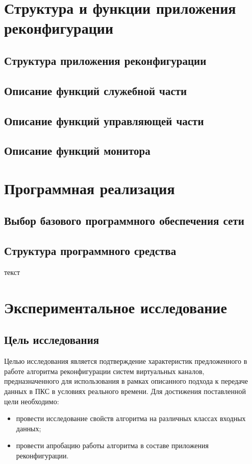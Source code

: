 \documentclass[12pt,fleqn]{article}
\begin{document}
\section{Структура и функции приложения реконфигурации}
\subsection{Структура приложения реконфигурации}
\subsection{Описание функций служебной части}
\subsection{Описание функций управляющей части}
\subsection{Описание функций монитора}


\section{Программная реализация}
\subsection{Выбор базового программного обеспечения сети}
\subsection{Структура программного средства}
текст

\section{Экспериментальное исследование}
\subsection{Цель исследования}
Целью исследования является подтверждение характеристик предложенного в работе алгоритма реконфигурации систем виртуальных каналов, предназначенного для использования в рамках описанного подхода к передаче данных в ПКС в условиях реального времени. Для достижения поставленной цели необходимо:
\begin{itemize}
	\item провести исследование свойств алгоритма на различных классах входных данных; 
	\item провести апробацию работы алгоритма в составе приложения реконфигурации.
\end{itemize}
\end{document}
